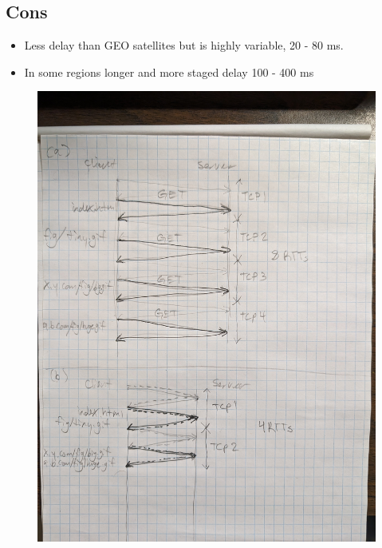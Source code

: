 \documentclass{article}
\begin{document}
\subsection{Cons}
\begin{itemize}
    \item Less delay than GEO satellites but is highly variable, 20 - 80 ms.
    \item In some regions longer and more staged delay 100 - 400 ms
\end{itemize}

\begin{figure}[h]
  \centering
  \includegraphics[width=\textwidth]{1.jpg}
\end{figure}
\end{document}
